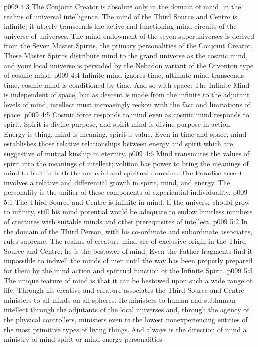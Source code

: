 \vs p009 4:3 \pc The Conjoint Creator is absolute only in the domain of mind, in the realms of universal intelligence. The mind of the Third Source and Centre is infinite; it utterly transcends the active and functioning mind circuits of the universe of universes. The mind endowment of the seven superuniverses is derived from the Seven Master Spirits, the primary personalities of the Conjoint Creator. These Master Spirits distribute mind to the grand universe as the cosmic mind, and your local universe is pervaded by the Nebadon variant of the Orvonton type of cosmic mind.
\vs p009 4:4 Infinite mind ignores time, ultimate mind transcends time, cosmic mind is conditioned by time. And so with space: The Infinite Mind is independent of space, but as descent is made from the infinite to the adjutant levels of mind, intellect must increasingly reckon with the fact and limitations of space.
\vs p009 4:5 \pc Cosmic force responds to mind even as cosmic mind responds to spirit. Spirit is divine purpose, and spirit mind is divine purpose in action. Energy is thing, mind is meaning, spirit is value. Even in time and space, mind establishes those relative relationships between energy and spirit which are suggestive of mutual kinship in eternity.
\vs p009 4:6 Mind transmutes the values of spirit into the meanings of intellect; volition has power to bring the meanings of mind to fruit in both the material and spiritual domains. The Paradise ascent involves a relative and differential growth in spirit, mind, and energy. The personality is the unifier of these components of experiential individuality.
\vs p009 5:1 The Third Source and Centre is infinite in mind. If the universe should grow to infinity, still his mind potential would be adequate to endow limitless numbers of creatures with suitable minds and other prerequisites of intellect.
\vs p009 5:2 In the domain of  the Third Person, with his co\hyp{}ordinate and subordinate associates, rules supreme. The realms of creature mind are of exclusive origin in the Third Source and Centre; he is the bestower of mind. Even the Father fragments find it impossible to indwell the minds of men until the way has been properly prepared for them by the mind action and spiritual function of the Infinite Spirit.
\vs p009 5:3 The unique feature of mind is that it can be bestowed upon such a wide range of life. Through his creative and creature associates the Third Source and Centre ministers to all minds on all spheres. He ministers to human and subhuman intellect through the adjutants of the local universes and, through the agency of the physical controllers, ministers even to the lowest nonexperiencing entities of the most primitive types of living things. And always is the direction of mind a ministry of mind\hyp{}spirit or mind\hyp{}energy personalities.

